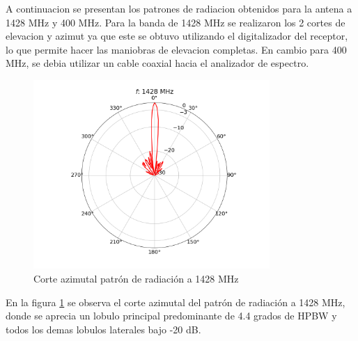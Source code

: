 A continuacion se presentan los patrones de radiacion obtenidos para la antena a 1428 MHz y 400 MHz. Para la banda de 1428 MHz se realizaron los 2 cortes de elevacion y azimut ya que este se obtuvo utilizando el digitalizador del receptor, lo que permite hacer las maniobras de elevacion completas. En cambio para 400 MHz, se debia utilizar un cable coaxial hacia el analizador de espectro.\\





\begin{figure}
    \centering
    \includegraphics[width=0.8\textwidth]{img/1420rp}
    \caption{Corte azimutal patrón de radiación a 1428 MHz}
    \label{fig:1420rp}
\end{figure}

En la figura \ref{fig:1420rp} se observa el corte azimutal del patrón de radiación a 1428 MHz, donde se aprecia un lobulo principal predominante de 4.4 grados de HPBW y todos los demas lobulos laterales bajo -20 dB.\\

